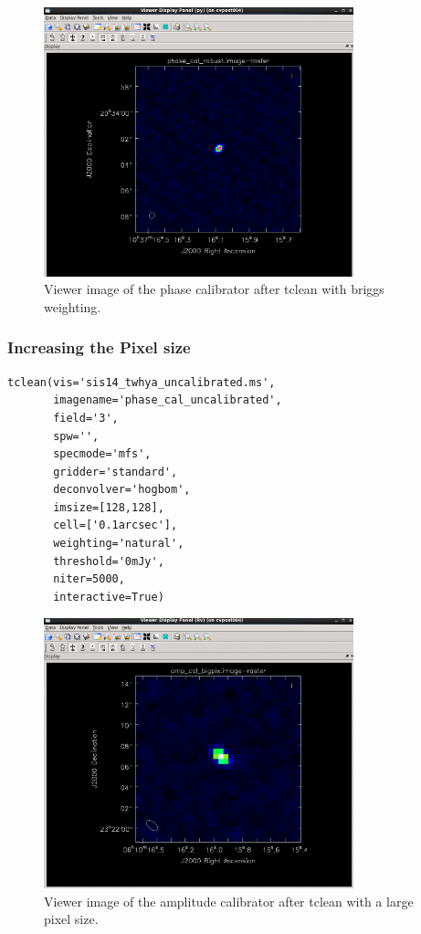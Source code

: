\begin{figure}[H]
	\centering
	\includegraphics[width=0.8\textwidth]{Images/tclean-robust.png}
	\caption{Viewer image of the phase calibrator after tclean with briggs weighting.}
\end{figure}

\clearpage

\subsubsection{Increasing the Pixel size}

\begin{lstlisting}[style=casa-python]
tclean(vis='sis14_twhya_uncalibrated.ms',
       imagename='phase_cal_uncalibrated',
       field='3',
       spw='',
       specmode='mfs',
       gridder='standard',
       deconvolver='hogbom',
       imsize=[128,128],
       cell=['0.1arcsec'],
       weighting='natural',
       threshold='0mJy',
       niter=5000,
       interactive=True)
\end{lstlisting}

\begin{figure}[H]
       \centering
       \includegraphics[width=0.8\textwidth]{Images/large-pixel-size.png}
       \caption{Viewer image of the amplitude calibrator after tclean with a large pixel size.}
\end{figure}

